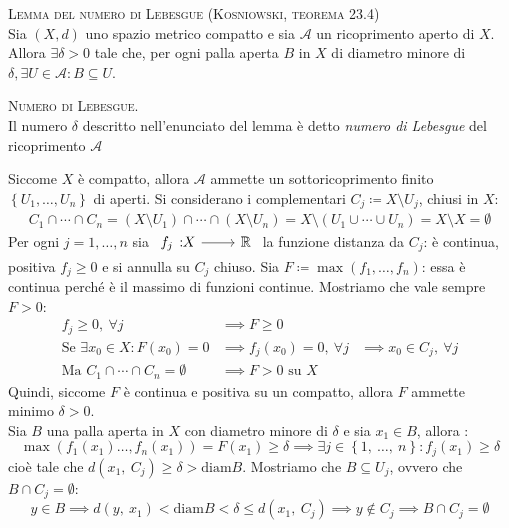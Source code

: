 \begin{lemming} \textsc{Lemma del numero di Lebesgue (Kosniowski, teorema 23.4)} \label{teo numero lebesgue}\\
	Sia $\left(X, d\right)$ uno spazio metrico compatto e sia $\mathcal{A}$ un ricoprimento aperto di $X$. Allora $\exists \delta >0$ tale che, per ogni palla aperta $B$ in $X$ di diametro minore di $\delta, \exists U\in\mathcal{A} \colon B\subseteq U$.	
\end{lemming}
\begin{define}\textsc{Numero di Lebesgue.}\\
	Il numero $\delta$ descritto nell'enunciato del lemma è detto \textit{numero di Lebesgue}  del ricoprimento $\mathcal{A}$
\end{define}
\begin{demonstration}
	Siccome $X$ è compatto, allora $\mathcal{A}$ ammette un sottoricoprimento finito $\left\{ U_1,\dots,U_n \right\}$ di aperti. Si considerano i complementari $C_j\coloneqq X\setminus U_j$, chiusi in $X$:
		\begin{gather*}
			 C_1\cap\cdots\cap C_n=(X\setminus U_1)\cap \cdots\cap(X\setminus U_n)=X\setminus(U_1\cup\cdots\cup U_n)=X\setminus X=\emptyset
		\end{gather*}	
	Per ogni $j=1,\dots,n$ sia $\funz {f_j} X \realset$ la funzione distanza da $C_j$: è continua, positiva $f_j\geq 0$ e si annulla su $C_j$ chiuso. Sia $F\coloneqq \max(f_1,\dots,f_n)$: essa è continua perché è il massimo di funzioni continue. Mostriamo che vale sempre $F>0$:
		\begin{equation*}
			\begin{array}{lll}
				f_j\geq 0,\ \forall j & \implies F\geq 0 &\\
				\text{Se } \exists x_0\in X \colon F(x_0)=0 &\implies f_j(x_0)=0,\ \forall j &\implies x_0\in C_j,\ \forall j\\
				\text{Ma } C_1\cap\cdots\cap C_n=\emptyset &\implies F>0 \text{ su } X&
			\end{array}
		\end{equation*}
	Quindi, siccome $F$ è continua e positiva su un compatto, allora $F$ ammette minimo $\delta>0$.\\
	Sia $B$ una palla aperta in $X$ con diametro minore di $\delta$ e sia $x_1\in B$, allora :
		\begin{equation*}
			\max\left( f_1(x_1)\dots,f_n(x_1) \right)=F(x_1)\geq \delta \implies \exists j\in\left\{1,\ \dots,\ n\right\}\colon f_j(x_1)\geq \delta 
		\end{equation*}
	cioè tale che $d(x_1,\ C_j)\geq \delta > \text{diam}B$. Mostriamo che $B\subseteq U_j$, ovvero che $B\cap C_j=\emptyset$:
		\begin{equation*}
			y\in B \implies d(y,\ x_1)< \text{diam}B<\delta \leq d(x_1,\ C_j) \implies y\notin C_j \implies B\cap C_j=\emptyset
		\end{equation*}
\end{demonstration}
